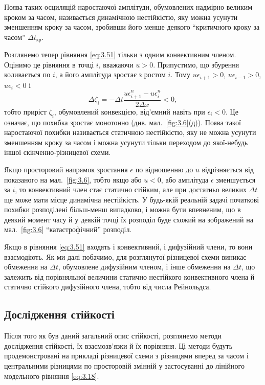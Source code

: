 Поява таких осциляцій наростаючої амплітуди, обумовлених надмірно великим кроком за часом, називається динамічною нестійкістю, яку можна усунути зменшенням кроку за часом, зробивши його менше деякого ``критичного кроку за часом'' $\Delta t_{\text{кр}}$. \medskip

Розглянемо тепер рівняння \eqref{eq:3.51} тільки з одним конвективним членом. Оцінимо це рівняння в точці $i$, вважаючи $u > 0$. Припустимо, що збурення коливається по $i$, а його амплітуда зростає з ростом $i$. Тому $u \epsilon_{i + 1} > 0$, $u \epsilon_{i - 1} > 0$, $u \epsilon_i < 0$ і 
\begin{equation}
    \label{eq:3.56}
    \Delta \zeta_i = - \Delta t \frac{u \epsilon_{i + 1}^n - u \epsilon_i^n}{2 \Delta x} < 0,
\end{equation}
тобто приріст $\zeta_i$, обумовлений конвекцією, від'ємний навіть при $\epsilon_i < 0$. Це означає, що похибка зростає монотонно (див. мал.~\ref{fig:3.6}(д)). Поява такої наростаючої похибки називається статичною нестійкістю, яку не можна усунути зменшенням кроку за часом і можна усунути тільки переходом до якої-небудь іншої скінченно-різницевої схеми. \medskip

Якщо просторовий напрямок зростання $\epsilon$ по відношенню до $u$ відрізняється від показаного на мал.~\ref{fig:3.6}, тобто якщо або $u < 0$, або амплітуда $\epsilon$ зменшується за $i$, то конвективний член стає статично стійким, але при достатньо великих $\Delta t$ ще може мати місце динамічна нестійкість. У будь-якій реальній задачі початкові похибки розподілені більш-менш випадково, і можна бути впевненим, що в деякий момент часу й у деякій точці їх розподіл буде схожий на зображений на мал.~\ref{fig:3.6} ``катастрофічний'' розподіл. \medskip

Якщо в рівняння \eqref{eq:3.51} входять і конвективний, і дифузійний члени, то вони взаємодіють. Як ми далі побачимо, для розглянутої різницевої схеми виникає обмеження на $\Delta t$, обумовлене дифузійним членом, і інше обмеження на $\Delta t$, що залежить від порівняльної величини статично нестійкого конвективного члена й статично стійкого дифузійного члена, тобто від числа Рейнольдса. 

\subsection{Дослідження стійкості}

Після того як був даний загальний опис стійкості, розглянемо методи дослідження стійкості, їх взаємозв'язки й їх порівняня. Ці методи будуть продемонстровані на прикладі різницевої схеми з різницями вперед за часом і центральними різницями по просторовій змінній у застосуванні до лінійного модельного рівняння \eqref{eq:3.18}.

